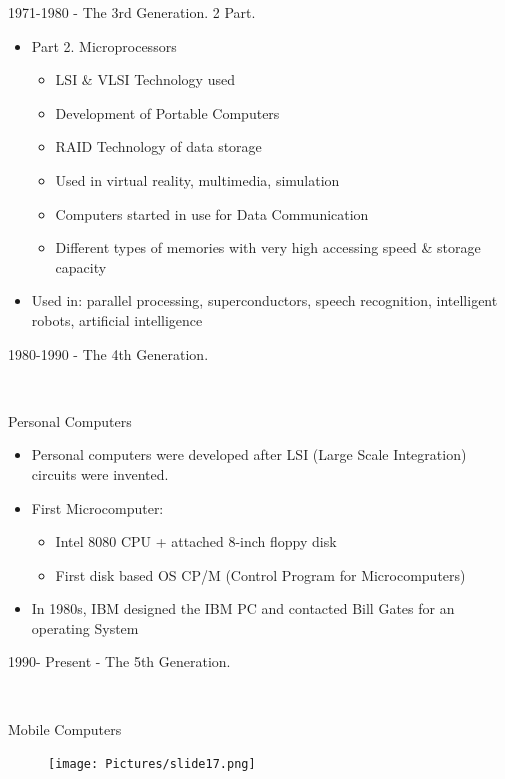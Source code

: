\documentclass{beamer}
\begin{document}
\begin{frame}
{\centerline{1971-1980 - The 3rd Generation. 2 Part.}}
\begin{itemize}
    \item Part 2. Microprocessors
    \begin{itemize}
        \item LSI \& VLSI Technology used
        \item Development of Portable Computers
        \item RAID Technology of data storage
        \item Used in virtual reality, multimedia, simulation
        \item Computers started in use for Data Communication
        \item Different types of memories with very high accessing speed & storage capacity
    \end{itemize}
    \item Used in: parallel processing, superconductors, speech recognition, intelligent robots, artificial intelligence
\end{itemize}
\end{frame}



\begin{frame}
{\centerline{1980-1990 - The 4th Generation.} \\\centerline{Personal Computers}}
\begin{itemize}
    \item Personal computers were developed after LSI (Large Scale Integration) circuits were invented.
    \item First Microcomputer:
    \begin{itemize}
        \item Intel 8080 CPU + attached 8-inch floppy disk
        \item First disk based OS CP/M (Control Program for Microcomputers)
    \end{itemize}
    \item In 1980s, IBM designed the IBM PC and contacted Bill Gates for an operating System
\end{itemize}
\end{frame}



\begin{frame}
{\centerline{1990- Present - The 5th Generation.} \\ \centerline{Mobile Computers}}
\begin{figure}
    \centering
    \texttt{[image: Pictures/slide17.png]}
\end{figure}
\end{frame}
\end{document}

